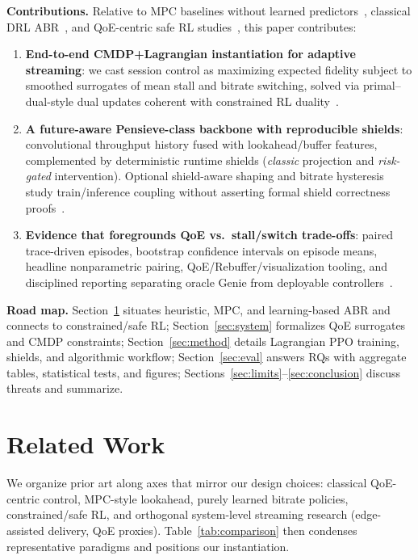 \documentclass[preprint,12pt]{elsarticle}
\begin{document}
\textbf{Contributions.} Relative to MPC baselines without learned predictors~\cite{yin2015control}, classical DRL ABR~\cite{mao2017neural,gadaleta2017ddash}, and QoE-centric safe RL studies~\cite{xiao2025qoe,tian2022towards}, this paper contributes:
\begin{enumerate}
  \item \textbf{End-to-end CMDP+Lagrangian instantiation for adaptive streaming}: we cast session control as maximizing expected fidelity subject to smoothed surrogates of mean stall and bitrate switching, solved via primal--dual-style dual updates coherent with constrained RL duality~\cite{paternain2019dual}.

  \item \textbf{A future-aware Pensieve-class backbone with reproducible shields}: convolutional throughput history fused with lookahead/buffer features, complemented by deterministic runtime shields (\emph{classic} projection and \emph{risk-gated} intervention). Optional shield-aware shaping and bitrate hysteresis study train/inference coupling without asserting formal shield correctness proofs~\cite{alshiekh2018shielding}.

  \item \textbf{Evidence that foregrounds QoE vs.\ stall/switch trade-offs}: paired trace-driven episodes, bootstrap confidence intervals on episode means, headline nonparametric pairing, QoE/Rebuffer/visualization tooling, and disciplined reporting separating oracle Genie from deployable controllers~\cite{mao2017neural}.

\end{enumerate}

\textbf{Road map.}
Section~\ref{sec:related} situates heuristic, MPC, and learning-based ABR and connects to constrained/safe RL; Section~\ref{sec:system} formalizes QoE surrogates and CMDP constraints; Section~\ref{sec:method} details Lagrangian PPO training, shields, and algorithmic workflow; Section~\ref{sec:eval} answers RQs with aggregate tables, statistical tests, and figures; Sections~\ref{sec:limits}--\ref{sec:conclusion} discuss threats and summarize.

\section{Related Work}
\label{sec:related}

We organize prior art along axes that mirror our design choices: classical QoE-centric control, MPC-style lookahead, purely learned bitrate policies, constrained/safe RL, and orthogonal system-level streaming research (edge-assisted delivery, QoE proxies). Table~\ref{tab:comparison} then condenses representative paradigms and positions our instantiation.
\end{document}
